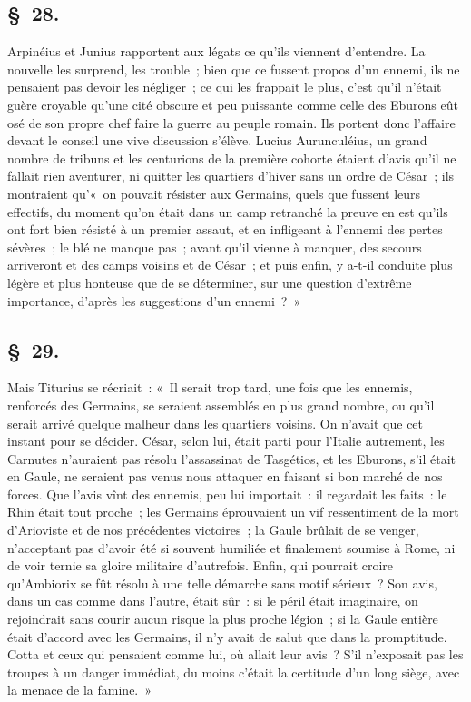 \documentclass[french,twoside]{book} %
\begin{document}
\subsection[{§ 28.}]{ \textsc{§ 28.} }
\noindent Arpinéius et Junius rapportent aux légats ce qu’ils viennent d’entendre. La nouvelle les surprend, les trouble ; bien que ce fussent propos d’un ennemi, ils ne pensaient pas devoir les négliger ; ce qui les frappait le plus, c’est qu’il n’était guère croyable qu’une cité obscure et peu puissante comme celle des Eburons eût osé de son propre chef faire la guerre au peuple romain. Ils portent donc l’affaire devant le conseil une vive discussion s’élève. Lucius Aurunculéius, un grand nombre de tribuns et les centurions de la première cohorte étaient d’avis qu’il ne fallait rien aventurer, ni quitter les quartiers d’hiver sans un ordre de César ; ils montraient qu’« on pouvait résister aux Germains, quels que fussent leurs effectifs, du moment qu’on était dans un camp retranché la preuve en est qu’ils ont fort bien résisté à un premier assaut, et en infligeant à l’ennemi des pertes sévères ; le blé ne manque pas ; avant qu’il vienne à manquer, des secours arriveront et des camps voisins et de César ; et puis enfin, y a-t-il conduite plus légère et plus honteuse que de se déterminer, sur une question d’extrême importance, d’après les suggestions d’un ennemi ? »
\subsection[{§ 29.}]{ \textsc{§ 29.} }
\noindent Mais Titurius se récriait : « Il serait trop tard, une fois que les ennemis, renforcés des Germains, se seraient assemblés en plus grand nombre, ou qu’il serait arrivé quelque malheur dans les quartiers voisins. On n’avait que cet instant pour se décider. César, selon lui, était parti pour l’Italie autrement, les Carnutes n’auraient pas résolu l’assassinat de Tasgétios, et les Eburons, s’il était en Gaule, ne seraient pas venus nous attaquer en faisant si bon marché de nos forces. Que l’avis vînt des ennemis, peu lui importait : il regardait les faits : le Rhin était tout proche ; les Germains éprouvaient un vif ressentiment de la mort d’Arioviste et de nos précédentes victoires ; la Gaule brûlait de se venger, n’acceptant pas d’avoir été si souvent humiliée et finalement soumise à Rome, ni de voir ternie sa gloire militaire d’autrefois. Enfin, qui pourrait croire qu’Ambiorix se fût résolu à une telle démarche sans motif sérieux ? Son avis, dans un cas comme dans l’autre, était sûr : si le péril était imaginaire, on rejoindrait sans courir aucun risque la plus proche légion ; si la Gaule entière était d’accord avec les Germains, il n’y avait de salut que dans la promptitude. Cotta et ceux qui pensaient comme lui, où allait leur avis ? S'il n’exposait pas les troupes à un danger immédiat, du moins c’était la certitude d’un long siège, avec la menace de la famine. »
\end{document}
